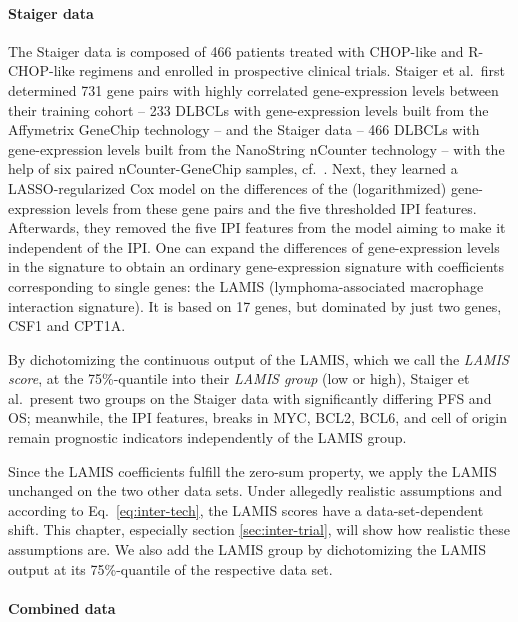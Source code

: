 \paragraph{Staiger data}

The Staiger data is composed of \num{466} patients treated with CHOP-like and R-CHOP-like regimens 
and enrolled in prospective clinical trials. 
Staiger et al.\ first determined \num{731} gene pairs with highly correlated gene-expression levels 
between their training cohort -- \num{233} DLBCLs with gene-expression levels built from the Affymetrix 
GeneChip technology -- and the Staiger data -- \num{466} DLBCLs with gene-expression levels built 
from the NanoString nCounter technology -- with the help of six paired nCounter-GeneChip samples, cf.\ 
\cite[Supplementary Methods]{staiger20}.
Next, they learned a LASSO-regularized Cox model on the differences of the (logarithmized) 
gene-expression levels from these gene pairs and the five thresholded IPI features.
Afterwards, they removed the five IPI features from the model aiming to make it independent of the 
IPI. One can expand the differences of gene-expression levels in the signature to obtain an ordinary 
gene-expression signature with coefficients corresponding to single genes: the LAMIS 
(lymphoma-associated macrophage interaction signature). It is 
based on \num{17} genes, but dominated by just two genes, CSF1 and CPT1A. 

By dichotomizing the 
continuous output of the LAMIS, which we call the \textit{LAMIS score}, at the 75\%-quantile into 
their \textit{LAMIS group} (low or high), Staiger et al.\ present two 
groups on the Staiger data with significantly differing PFS and OS; 
meanwhile, the IPI features, breaks in MYC, BCL2, BCL6, and cell of origin remain prognostic 
indicators independently of the LAMIS group.

Since the LAMIS coefficients fulfill the 
zero-sum property, we apply the LAMIS unchanged on the two other data sets. Under allegedly realistic 
assumptions and according to Eq.\ \eqref{eq:inter-tech}, the LAMIS scores have a data-set-dependent 
shift. This chapter, especially section \ref{sec:inter-trial}, will show how realistic these 
assumptions are. 
We also add the LAMIS group by dichotomizing the LAMIS output at its 75\%-quantile of the respective 
data set.

\paragraph{Combined data}

